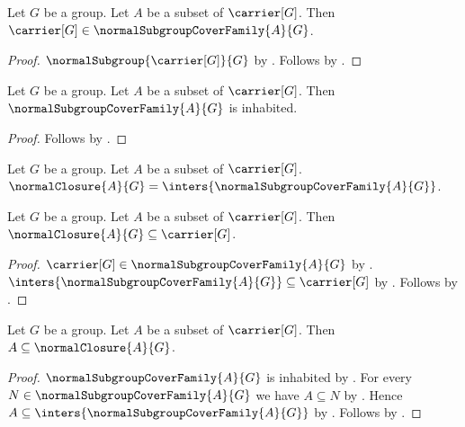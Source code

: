 \begin{proposition}\label{normal_subgroup_cover_family_contains_carrier}
    Let $G$ be a group.
    Let $A$ be a subset of $\carrier[G]$.
    Then $\carrier[G]\in\normalSubgroupCoverFamily{A}{G}$.
\end{proposition}
\begin{proof}
    $\normalSubgroup{\carrier[G]}{G}$ by
        .
    Follows by
        .
\end{proof}

\begin{corollary}\label{normal_subgroup_cover_family_inhabited}
    Let $G$ be a group.
    Let $A$ be a subset of $\carrier[G]$.
    Then $\normalSubgroupCoverFamily{A}{G}$ is inhabited.
\end{corollary}
\begin{proof}
    Follows by
        .
\end{proof}

\begin{definition}\label{normal_closure}
    Let $G$ be a group.
    Let $A$ be a subset of $\carrier[G]$.
    $\normalClosure{A}{G}=
        \inters{\normalSubgroupCoverFamily{A}{G}}$.
\end{definition}

\begin{proposition}\label{normal_closure_subseteq_carrier}
    Let $G$ be a group.
    Let $A$ be a subset of $\carrier[G]$.
    Then $\normalClosure{A}{G}\subseteq\carrier[G]$.
\end{proposition}
\begin{proof}
    $\carrier[G]\in\normalSubgroupCoverFamily{A}{G}$ by
        .
    $\inters{\normalSubgroupCoverFamily{A}{G}}\subseteq\carrier[G]$ by
        .
    Follows by .
\end{proof}

\begin{proposition}\label{normal_closure_contains_generators}
    Let $G$ be a group.
    Let $A$ be a subset of $\carrier[G]$.
    Then $A\subseteq\normalClosure{A}{G}$.
\end{proposition}
\begin{proof}
    $\normalSubgroupCoverFamily{A}{G}$ is inhabited by
        .
    For every $N\in\normalSubgroupCoverFamily{A}{G}$ we have
        $A\subseteq N$ by
        .
    Hence $A\subseteq\inters{\normalSubgroupCoverFamily{A}{G}}$ by
        .
    Follows by .
\end{proof}

